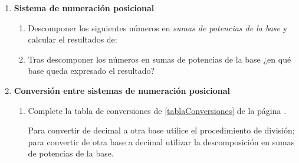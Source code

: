 \documentclass[12pt]{article}
\begin{document}
\begin{enumerate}
\begin{enumerate}

    \end{enumerate}

    \item \textbf{Sistema de numeración posicional}

        \begin{enumerate}

            \item Descomponer los siguientes números en \emph{sumas de potencias
                de la base} y calcular el resultados de:


            \item Tras descomponer los números en sumas de potencias de la
                base ¿en qué base queda expresado el resultado?

        \end{enumerate}

    \item \textbf{Conversión entre sistemas de numeración posicional}

    \begin{enumerate}

        \item Complete la tabla de conversiones de \ref{tablaConversiones} de
            la página \pageref{tablaConversiones}. \label{ejTabla}

            Para convertir de decimal a otra base utilice el procedimiento de
            división; para convertir de otra base a decimal utilizar la
            descomposición en sumas de potencias de la base.


\end{enumerate}
\end{enumerate}
\end{document}
